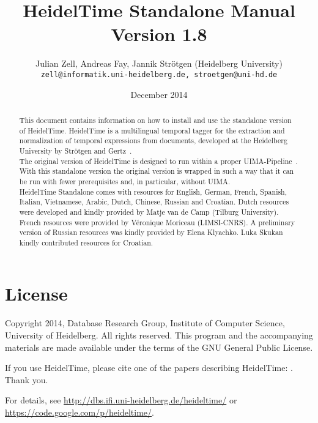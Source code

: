 \documentclass[
     11pt,         %
     a4paper,      %
     oneside,
     ]{article}
\newcommand{\languages}{English, German, French, Spanish, Italian, Vietnamese, Arabic, Dutch, Chinese, Russian and Croatian}
\begin{document}
\title{%
HeidelTime Standalone Manual\\Version 1.8
}
\author{Julian Zell, Andreas Fay, Jannik Str\"otgen (Heidelberg University)\\[0.2em]
\small \texttt{zell@informatik.uni-heidelberg.de, stroetgen@uni-hd.de}
}
\date{December 2014}
\maketitle

\begin{abstract}
This document contains information on how to install and use the standalone version of HeidelTime. HeidelTime is a multilingual temporal tagger for the extraction and normalization of temporal expressions from documents, developed at the Heidelberg University by Str\"otgen and Gertz~\cite{Strotgen2010, HeidelTime, StroetgenGertz2013}.\\
The original version of HeidelTime is designed to run within a proper UIMA-Pipeline~\cite{UIMA}. With this standalone version the original version is wrapped in such a way that it can be run with fewer prerequisites and, in particular, without UIMA.\\
HeidelTime Standalone comes with resources for \languages. Dutch resources were developed and kindly provided by Matje van de Camp (Tilburg University)\cite{Matje}. French resources were provided by Véronique Moriceau (LIMSI-CNRS)\cite{Veronique}. A preliminary version of Russian resources was kindly provided by Elena Klyachko\cite{Elena}. Luka Skukan\cite{Luka} kindly contributed resources for Croatian.
\end{abstract}

\newpage
\tableofcontents
\newpage






\newpage
\section{License}
Copyright \textcopyright{} 2014, Database Research Group, Institute of Computer Science, University of Heidelberg. 
All rights reserved. This program and the accompanying materials 
are made available under the terms of the GNU General Public License.

If you use HeidelTime, please cite one of the papers describing HeidelTime: \cite{Strotgen2010, StroetgenGertz2013}. Thank you.

For details, see \url{http://dbs.ifi.uni-heidelberg.de/heideltime/} or \\
\url{https://code.google.com/p/heideltime/}.



\newpage



\newpage

\end{document}
